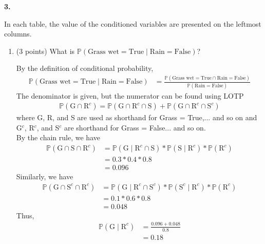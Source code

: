 \documentclass[12pt]{amsart}
\newenvironment{statement}[1]{\smallskip\noindent\color[rgb]{0.0,0.0,0.0} {\bf #1.}}{}
\newcommand{\Grass}{\text{G}}
\newcommand{\Rain}{\text{R}}
\newcommand{\Sprinkler}{\text{S}}
\newcommand{\bP}{\mathbb{P}}
\newcommand{\1}{\mathds{1}}
\begin{document}
\begin{statement}{3}
\begin{center}
\begin{tikzpicture}[
  node distance=1cm and 0cm,
  mynode/.style={draw,ellipse,text width=2cm,align=center}
]
\end{tikzpicture}
\end{center}
    In each table, the value of the conditioned variables are presented on the leftmost columns.
    \begin{enumerate}
        \item (3 points) What is $\mathbb{P}(\text{Grass wet}=\text{True}\mid \text{Rain}=\text{False})$?
        \begin{tcolorbox}
            By the definition of conditional probability,
            \begin{align*}
                 \bP(\text{Grass wet} = \text{True}\mid \text{Rain}=\text{False}) &= \frac{\bP(\text{Grass wet} = \text{True}\cap \text{Rain}=\text{False})}{\bP(\text{Rain}=\text{False})}
            \end{align*}
            The denominator is given, but the numerator can be found using LOTP
            \begin{align*}
                \bP(\Grass \cap \Rain^c) = \bP(\Grass\cap \Rain^c\cap \Sprinkler) + \bP(\Grass\cap\Rain^c \cap \Sprinkler^c)
            \end{align*}
            where G, R, and S are used as shorthand for Grass = True,... and so on and G$^c$, R$^c$, and S$^c$ are shorthand for 
            Grass = False... and so on. \\ 
            By the chain rule, we have 
            \begin{align*}
                \bP(\Grass\cap\Sprinkler\cap\Rain^c) &= \bP(\Grass\mid \Rain^c\cap \Sprinkler)*\bP(\Sprinkler\mid \Rain^c)*\bP(\Rain^c)\\ 
                &= 0.3*0.4*0.8\\ 
                &= 0.096
            \end{align*}
            Similarly, we have
            \begin{align*}
                \bP(\Grass\cap\Sprinkler^c\cap\Rain^c) &= \bP(\Grass\mid \Rain^c\cap \Sprinkler^c)*\bP(\Sprinkler^c\mid \Rain^c)*\bP(\Rain^c)\\ 
                &= 0.1*0.6*0.8\\
                &= 0.048
            \end{align*}
            Thus, 
            \begin{align*}
                \bP(\Grass\mid \Rain^c) &= \frac{0.096 + 0.048}{0.8}\\ 
                &= 0.18
            \end{align*}
        \end{tcolorbox}

\end{enumerate}
\end{statement}
\end{document}
